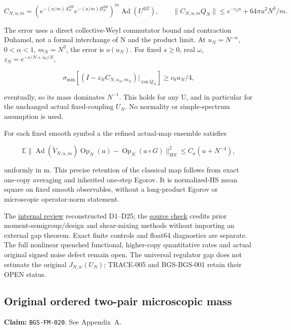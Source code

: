\[
C_{N,u,m}=
 (e^{-(u/m)A_N^{\mathrm{diff}}}e^{-(u/m)B_N^{\mathrm{diff}}})^m
       \operatorname{Ad}(U^{\otimes2}),\qquad
\|C_{N,u,m}Q_N\|\le e^{-c_0u}+64\pi u^2N^3/m.
\]

The error uses a direct collective-Weyl commutator bound and contraction
Duhamel, not a formal interchange of N and the product limit. At
\(u_N=N^{-\alpha}\), \(0<\alpha<1\), \(m_N=N^3\), the error is \(o(u_N)\).
For fixed \(s\ge0\), real \(\omega\), \(z_N=e^{-s/N+i\omega/N}\),

\[
\sigma_{\min}[(I-z_NC_{N,u_N,m_N})|_{\operatorname{ran}Q_N}]
\ge c_0u_N/4,
\]

eventually, so its mass dominates \(N^{-1}\). This holds for any U,
and in particular for the unchanged actual fixed-coupling \(U_N\).
No normality or simple-spectrum assumption is used.

For each fixed smooth symbol a the refined actual-map ensemble satisfies

\[
\mathbb E\|\operatorname{Ad}(\widetilde V_{N,u,m})\operatorname{Op}_N(a)
       -\operatorname{Op}_N(a\circ G)\|_{HS}^2
\le C_a(u+N^{-4}),
\]

uniformly in m. This precise retention of the classical map follows
from exact one-copy averaging and inherited one-step Egorov. It is
normalized-HS mean square on fixed smooth observables, without a
long-product Egorov or microscopic operator-norm statement.

The \href{https://github.com/ChurilovMaksim/BGS/blob/main/archive/record/collective_diffusion_review_20261006.md}{internal review}
reconstructed D1--D25; the \href{https://github.com/ChurilovMaksim/BGS/blob/main/literature/collective_diffusion_sources_20261006.md}{source check}
credits prior moment-semigroup/design and shear-mixing methods without
importing an external gap theorem. Exact finite controls and float64
diagnostics are separate. The full nonlinear quenched functional,
higher-copy quantitative rates and actual original signed noise defect
remain open. The universal regulator gap does not estimate the original
\(J_{N,w}(U_N)\); TRACE-005 and BGS-BGS-001 retain their OPEN status.

\hypertarget{original-ordered-two-pair-microscopic-mass}{%
\subsection{Original ordered two-pair microscopic mass}\label{original-ordered-two-pair-microscopic-mass}}

\textbf{Claim:} \texttt{BGS-FM-020}. See Appendix~A.

